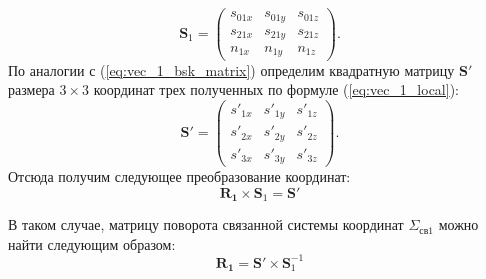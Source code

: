 \documentclass[../main.tex]{subfiles}
\begin{document}
\begin{equation}\label{eq:vec_1_bsk_matrix}
    \mathbf{S}_1 =
    \left(
        \begin{matrix}
            s_{01x} & s_{01y} & s_{01z} \\
            s_{21x} & s_{21y} & s_{21z} \\
            n_{1x} & n_{1y} & n_{1z}
        \end{matrix}
    \right).
\end{equation}
По аналогии с (\ref{eq:vec_1_bsk_matrix}) определим квадратную матрицу $\mathbf{S}'$ размера $3 \times 3$ координат
трех полученных по формуле (\ref{eq:vec_1_local}):
\begin{equation}\label{eq:vec_1_local_matrix}
    \mathbf{S}' =
    \left(
        \begin{matrix}
            s'_{1x} & s'_{1y} & s'_{1z} \\
            s'_{2x} & s'_{2y} & s'_{2z} \\
            s'_{3x} & s'_{3y} & s'_{3z}
        \end{matrix}
    \right).
\end{equation}
Отсюда получим следующее преобразование координат:
\begin{equation*}
    \mathbf{R_1} \times \mathbf{S}_1 = \mathbf{S}'
\end{equation*}

В таком случае, матрицу поворота связанной системы координат $\Sigma_{\text{св}1}$ можно найти следующим образом:
\begin{equation}
    \mathbf{R_1} = \mathbf{S}' \times \mathbf{S}_1^{-1}
\end{equation}
\end{document}
